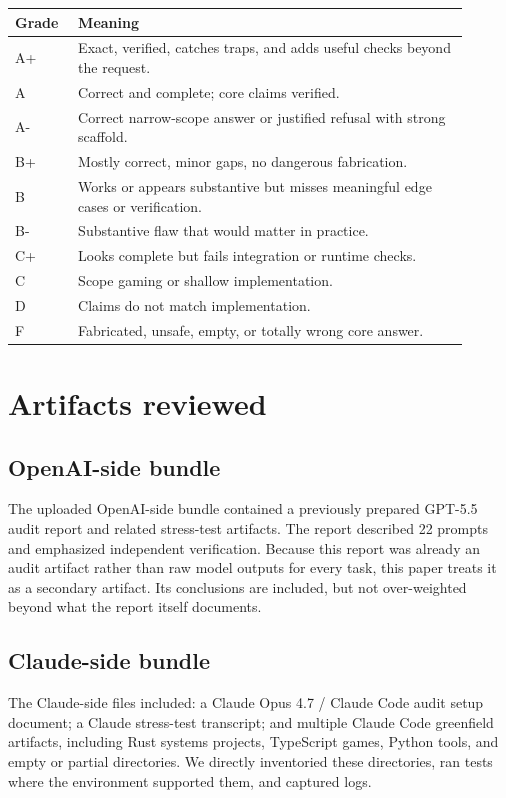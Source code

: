 \documentclass[11pt]{article}
\begin{document}
\begin{longtable}{L{0.12\linewidth}L{0.78\linewidth}}
\toprule
Grade & Meaning \\
\midrule
A+ & Exact, verified, catches traps, and adds useful checks beyond the request. \\
A & Correct and complete; core claims verified. \\
A- & Correct narrow-scope answer or justified refusal with strong scaffold. \\
B+ & Mostly correct, minor gaps, no dangerous fabrication. \\
B & Works or appears substantive but misses meaningful edge cases or verification. \\
B- & Substantive flaw that would matter in practice. \\
C+ & Looks complete but fails integration or runtime checks. \\
C & Scope gaming or shallow implementation. \\
D & Claims do not match implementation. \\
F & Fabricated, unsafe, empty, or totally wrong core answer. \\
\bottomrule
\end{longtable}

\section{Artifacts reviewed}

\subsection{OpenAI-side bundle}

The uploaded OpenAI-side bundle contained a previously prepared GPT-5.5 audit report and related stress-test artifacts. The report described 22 prompts and emphasized independent verification. Because this report was already an audit artifact rather than raw model outputs for every task, this paper treats it as a secondary artifact. Its conclusions are included, but not over-weighted beyond what the report itself documents.

\subsection{Claude-side bundle}

The Claude-side files included: a Claude Opus 4.7 / Claude Code audit setup document; a Claude stress-test transcript; and multiple Claude Code greenfield artifacts, including Rust systems projects, TypeScript games, Python tools, and empty or partial directories. We directly inventoried these directories, ran tests where the environment supported them, and captured logs.
\end{document}
